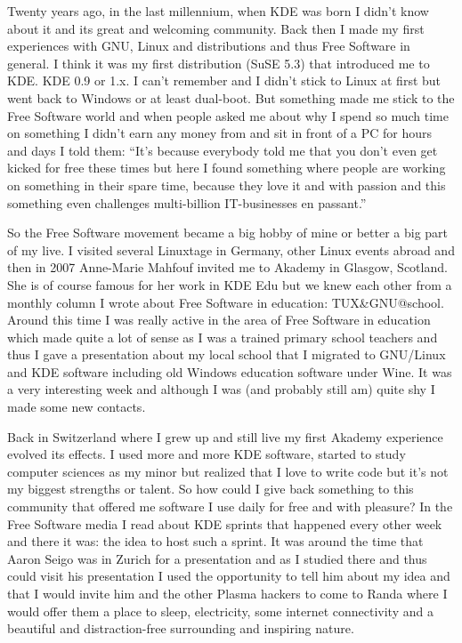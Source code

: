 


\noindent{}Twenty years ago, in the last millennium, when KDE was born I didn't know about it and its great and welcoming community. Back then I made my first experiences with GNU, Linux and distributions and thus Free Software in general. I think it was my first distribution (SuSE 5.3) that introduced me to KDE. KDE 0.9 or 1.x. I can't remember and I didn't stick to Linux at first but went back to Windows or at least dual-boot. But something made me stick to the Free Software world and when people asked me about why I spend so much time on something I didn't earn any money from and sit in front of a PC for hours and days I told them:
``It's because everybody told me that you don't even get kicked for free these times but here I found something where people are working on something in their spare time, because they love it and with passion and this something even challenges multi-billion IT-businesses en passant.''

So the Free Software movement became a big hobby of mine or better a big part of my live. I visited several Linuxtage in Germany, other Linux events abroad and then in 2007 Anne-Marie Mahfouf invited me to Akademy in Glasgow, Scotland. She is of course famous for her work in KDE Edu but we knew each other from a monthly column I wrote about Free Software in education: TUX\&GNU@school. Around this time I was really active in the area of Free Software in education which made quite a lot of sense as I was a trained primary school teachers and thus I gave a presentation about my local school that I migrated to GNU/Linux and KDE software including old Windows education software under Wine. It was a very interesting week and although I was (and probably still am) quite shy I made some new contacts.

Back in Switzerland where I grew up and still live my first Akademy experience evolved its effects. I used more and more KDE software, started to study computer sciences as my minor but realized that I love to write code but it's not my biggest strengths or talent. So how could I give back something to this community that offered me software I use daily for free and with pleasure? In the Free Software media I read about KDE sprints that happened every other week and there it was: the idea to host such a sprint. It was around the time that Aaron Seigo was in Zurich for a presentation and as I studied there and thus could visit his presentation I used the opportunity to tell him about my idea and that I would invite him and the other Plasma hackers to come to Randa where I would offer them a place to sleep, electricity, some internet connectivity and a beautiful and distraction-free surrounding and inspiring nature.

